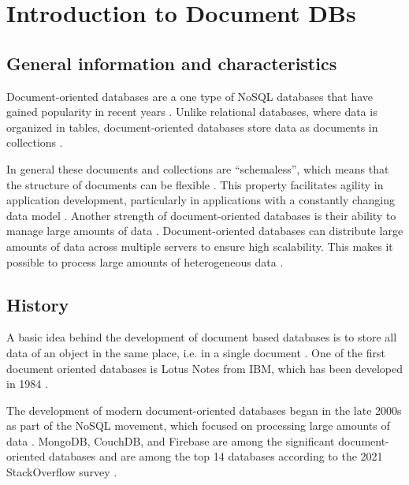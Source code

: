 
\section{Introduction to Document DBs}


\subsection{General information and characteristics}
Document-oriented databases are a one type of NoSQL databases that have gained popularity in recent years \parencite[p. 487]{Bach2016}. 
Unlike relational databases, where data is organized in tables, document-oriented databases store data as documents in collections \parencite[p. 493]{Bach2016}.

In general these documents and collections are \enquote{schemaless}, which means that the structure of documents can be flexible \parencite[p. 493]{Bach2016}.
This property facilitates agility in application development, particularly in applications with a constantly changing data model \parencite[p. 486]{Bach2016}.
Another strength of document-oriented databases is their ability to manage large amounts of data \parencite[p. 487]{Bach2016}. 
Document-oriented databases can distribute large amounts of data across multiple servers to ensure high scalability. 
This makes it possible to process large amounts of heterogeneous data \parencite[p. 229]{Meier2016}.

\subsection{History}
A basic idea behind the development of document based databases is to store all data of an object in the same place, i.e. in a single document \parencite{Faeskorn-Woyke2013}. 
One of the first document oriented databases is Lotus Notes from IBM, which has been developed in 1984 \parencite{Faeskorn-Woyke2013}.

The development of modern document-oriented databases began in the late 2000s as part of the NoSQL 
movement, which focused on processing large amounts of data \parencite[p. 41]{Eisermann2022}. 
MongoDB, CouchDB, and Firebase are among the significant document-oriented databases and 
are among the top 14 databases according to the 2021 StackOverflow survey \parencite[p. 41]{Eisermann2022}. 
